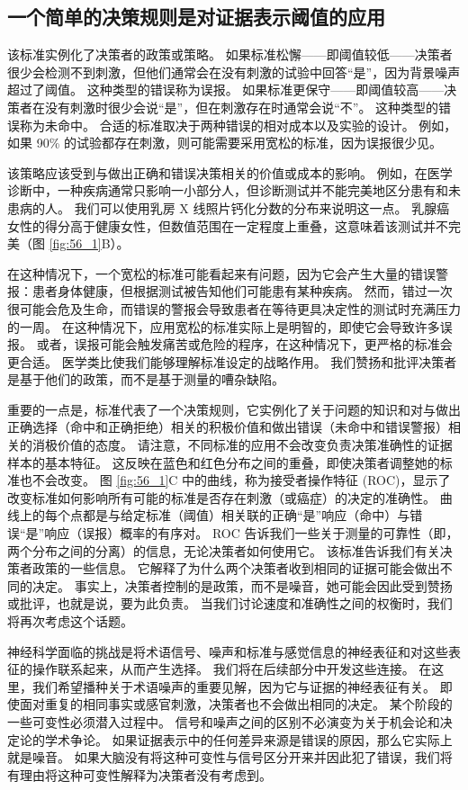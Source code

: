 \subsection{一个简单的决策规则是对证据表示阈值的应用}
该标准实例化了决策者的政策或策略。 如果标准松懈——即阈值较低——决策者很少会检测不到刺激，但他们通常会在没有刺激的试验中回答“是”，因为背景噪声超过了阈值。 这种类型的错误称为误报。 如果标准更保守——即阈值较高——决策者在没有刺激时很少会说“是”，但在刺激存在时通常会说“不”。 这种类型的错误称为未命中。 合适的标准取决于两种错误的相对成本以及实验的设计。 例如，如果 90\% 的试验都存在刺激，则可能需要采用宽松的标准，因为误报很少见。

该策略应该受到与做出正确和错误决策相关的价值或成本的影响。 例如，在医学诊断中，一种疾病通常只影响一小部分人，但诊断测试并不能完美地区分患有和未患病的人。 我们可以使用乳房 X 线照片钙化分数的分布来说明这一点。 乳腺癌女性的得分高于健康女性，但数值范围在一定程度上重叠，这意味着该测试并不完美（图 \ref{fig:56_1}B）。

在这种情况下，一个宽松的标准可能看起来有问题，因为它会产生大量的错误警报：患者身体健康，但根据测试被告知他们可能患有某种疾病。 然而，错过一次很可能会危及生命，而错误的警报会导致患者在等待更具决定性的测试时充满压力的一周。 在这种情况下，应用宽松的标准实际上是明智的，即使它会导致许多误报。 或者，误报可能会触发痛苦或危险的程序，在这种情况下，更严格的标准会更合适。 医学类比使我们能够理解标准设定的战略作用。 我们赞扬和批评决策者是基于他们的政策，而不是基于测量的嘈杂缺陷。

重要的一点是，标准代表了一个决策规则，它实例化了关于问题的知识和对与做出正确选择（命中和正确拒绝）相关的积极价值和做出错误（未命中和错误警报）相关的消极价值的态度。 请注意，不同标准的应用不会改变负责决策准确性的证据样本的基本特征。 这反映在蓝色和红色分布之间的重叠，即使决策者调整她的标准也不会改变。 图 \ref{fig:56_1}C 中的曲线，称为接受者操作特征 (ROC)，显示了改变标准如何影响所有可能的标准是否存在刺激（或癌症）的决定的准确性。 曲线上的每个点都是与给定标准（阈值）相关联的正确“是”响应（命中）与错误“是”响应（误报）概率的有序对。 ROC 告诉我们一些关于测量的可靠性（即，两个分布之间的分离）的信息，无论决策者如何使用它。 该标准告诉我们有关决策者政策的一些信息。 它解释了为什么两个决策者收到相同的证据可能会做出不同的决定。 事实上，决策者控制的是政策，而不是噪音，她可能会因此受到赞扬或批评，也就是说，要为此负责。 当我们讨论速度和准确性之间的权衡时，我们将再次考虑这个话题。

神经科学面临的挑战是将术语信号、噪声和标准与感觉信息的神经表征和对这些表征的操作联系起来，从而产生选择。 我们将在后续部分中开发这些连接。 在这里，我们希望播种关于术语噪声的重要见解，因为它与证据的神经表征有关。 即使面对重复的相同事实或感官刺激，决策者也不会做出相同的决定。 某个阶段的一些可变性必须潜入过程中。 信号和噪声之间的区别不必演变为关于机会论和决定论的学术争论。 如果证据表示中的任何差异来源是错误的原因，那么它实际上就是噪音。 如果大脑没有将这种可变性与信号区分开来并因此犯了错误，我们将有理由将这种可变性解释为决策者没有考虑到。


